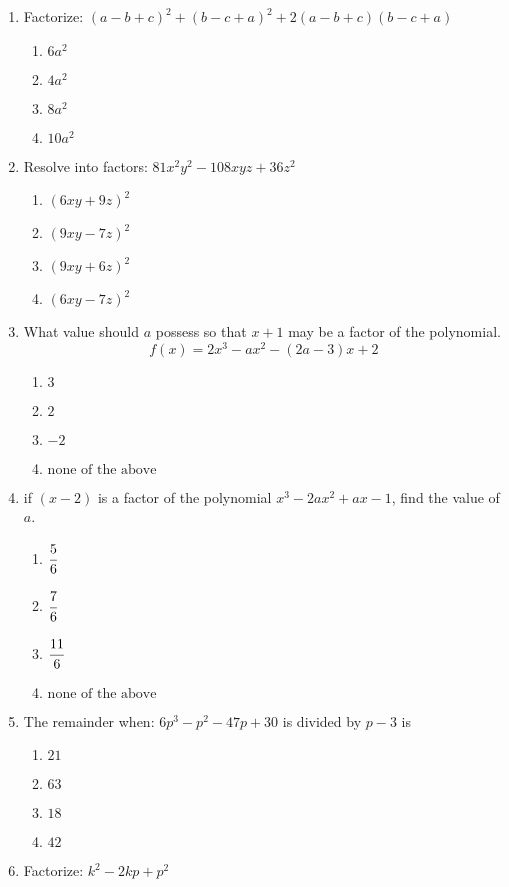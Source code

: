 \begin{multicols}{2}
\begin{enumerate}[label={\arabic*.}]
\item Factorize: $(a-b+c)^2 + (b-c+a)^2 + 2(a -b +c)(b-c+a)$
	\begin{enumerate}[label={\Alph*.}]
	\item \(6a^2\)
	\item \(4a^2\)
	\item \(8a^2\)
	\item \(10a^2\)
	\end{enumerate}
\item Resolve into factors: $81x^2y^2 - 108xyz + 36z^2$
	\begin{enumerate}[label={\Alph*.}]
	\item \((6xy + 9z)^2\)
	\item \((9xy - 7z)^2\)
	\item \((9xy + 6z)^2\)
	\item \((6xy - 7z)^2\)
	\end{enumerate}
\item What value should $a$ possess so that $x+1$ may be a factor of the polynomial. 
$$f(x) = 2x^3 - ax^2 - (2a -3)x + 2$$
	\begin{enumerate}[label={\Alph*.}]
	\item \(3\)
	\item \(2\)
	\item \(-2\)
	\item \(\text{none of the above}\)
	\end{enumerate}
\item if $(x-2)$ is a factor of the polynomial $x^3 - 2ax^2 +ax -1$, find the value of $a$.
	\begin{enumerate}[label={\Alph*.}]
	\item \(\cfrac{5}{6}\)
	\item \(\cfrac{7}{6}\)
	\item \(\cfrac{11}{6}\)
	\item \(\text{none of the above}\)
	\end{enumerate}
\item The remainder when: $6p^3 - p^2 -47p + 30$ is divided by $p-3$ is 	
\begin{enumerate}[label={\Alph*.}]
	\item \(21\)
	\item \(63\)
	\item \(18\)
	\item \(42\)
	\end{enumerate}
\item Factorize: $k^2 - 2kp + p^2$
	\begin{enumerate}[label={\Alph*.}]

\end{enumerate}
\end{enumerate}
\end{multicols}
